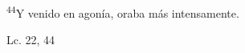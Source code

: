 \documentclass[../../rosario.tex]{subfiles}
\begin{document}
    \textsuperscript{44}Y venido en agonía, oraba más intensamente. 
    \begin{flushright}
    Lc. 22, 44
    \end{flushright}
\end{document}
